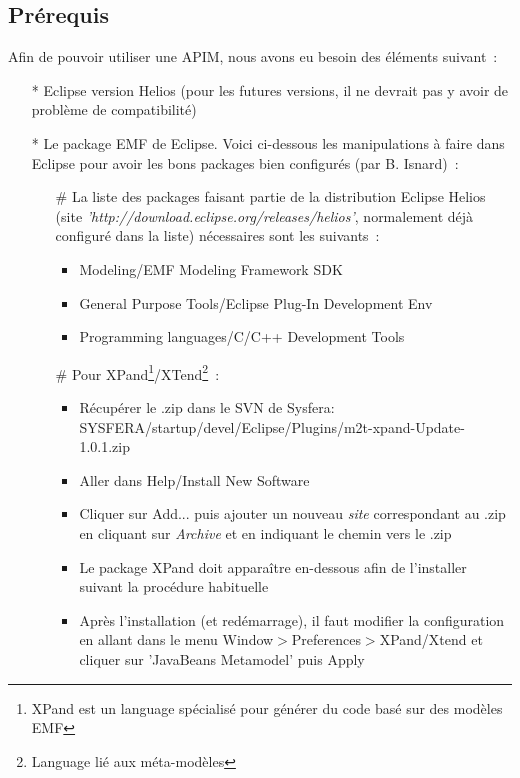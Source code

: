 \documentclass{article}
\begin{document}
\subsection*{Pr\'erequis}
Afin de pouvoir utiliser une APIM, nous avons eu besoin des \'el\'ements suivant~:
\begin{itemize}
\item[*] Eclipse version Helios (pour les futures versions, il ne devrait pas y avoir de probl\`eme de compatibilit\'e)
\item[*] Le package EMF de Eclipse. Voici ci-dessous les manipulations \`a faire dans Eclipse pour avoir les bons packages bien configur\'es (par B. Isnard)~:
  \begin{itemize}
  \item[\#] La liste des packages faisant partie de la distribution Eclipse Helios (site \textit{'http://download.eclipse.org/releases/helios'}, normalement d\'ej\`a configur\'e dans la liste) n\'ecessaires sont les suivants~:
    \begin{itemize}
      \item Modeling/EMF Modeling Framework SDK
      \item General Purpose Tools/Eclipse Plug-In Development Env
      \item Programming languages/C/C++ Development Tools
    \end{itemize}
  \item[\#] Pour XPand\footnote{XPand est un language sp\'ecialis\'e pour g\'en\'erer du code bas\'e sur des mod\`eles EMF}/XTend\footnote{Language li\'e aux m\'eta-mod\`eles}~:
    \begin{itemize}
    \item R\'ecup\'erer le .zip dans le SVN de Sysfera: SYSFERA/startup/devel/Eclipse\-/Plugins/m2t-xpand-Update-1.0.1.zip
    \item Aller dans Help/Install New Software
    \item Cliquer sur Add... puis ajouter un nouveau \textit{site} correspondant au .zip en cliquant sur \textit{Archive} et en indiquant le chemin vers le .zip
    \item Le package XPand doit appara\^itre en-dessous afin de l'installer suivant la proc\'edure habituelle
    \item Après l'installation (et red\'emarrage), il faut modifier la configuration en allant dans le menu Window$>$Preferences$>$XPand/Xtend et cliquer sur 'JavaBeans Metamodel' puis Apply
    \end{itemize}


\end{itemize}
\end{itemize}
\end{document}
